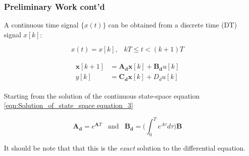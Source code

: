\documentclass{beamer}
\begin{document}
\begin{frame}
	
	\frametitle{Preliminary Work cont'd}
	
	A continuous time signal $\{x(t)\}$ can be obtained from a discrete time (DT) signal ${x[k]}$:
	
	\begin{equation}
		\label{eqn:zero_order_hold}
		{x}(t) = x[k], \;\;\; kT \leq t < (k+1)T
	\end{equation}
	
	\begin{align}
		\begin{split}
			\bm{x}[k+1] &= \bm{A_{d}}\bm{x}[k] + \bm{B_{d}}u[k] \\
			y[k] &= \bm{C_{d}}\bm{x}[k] +  D_{d}u[k]
		\end{split}
	\end{align}

	 Starting from the solution of the continuous state-space equation \ref{eqn:Solution_of_state_space equation_3}
	
	\begin{equation}
		\label{eqn:discrete_system_matrices}
		\bm{A_d} = e^{\bm{A}T}\;\;\;\text{and}\;\;\;\bm{B_{d}}=\bigg(\int_{0}^{T}e^{A\tau}d\tau\bigg)\bm{B} 
	\end{equation}
	
	It should be note that that this is the \textit{exact} solution to the differential equation.

\end{frame}
\end{document}
